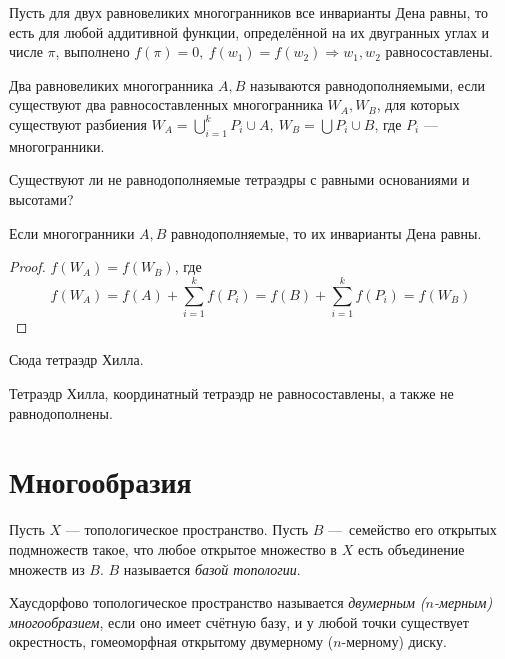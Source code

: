 \begin{theorem}[Сидлер]
    Пусть для двух равновеликих многогранников все инварианты Дена равны, то есть для любой аддитивной функции, определённой на их двугранных углах и числе $\pi$, выполнено $f(\pi) = 0, \ f(w_1) = f(w_2) \Rightarrow w_1, w_2$ равносоставлены.
\end{theorem}

\begin{definition}
    Два равновеликих многогранника $A, B$ называются равнодополняемыми, если существуют два равносоставленных многогранника $W_A, W_B$, для которых существуют разбиения $W_A = \bigcup_{i = 1}^k P_i \cup A, \ W_B = \bigcup P_i \cup B$, где $P_i$ — многогранники.
\end{definition}

\begin{theorem}
    Существуют ли не равнодополняемые тетраэдры с равными основаниями и высотами?
\end{theorem}

\begin{statement}
    Если многогранники $A,B$ равнодополняемые, то их инварианты Дена равны.
\end{statement}
\begin{proof}
    $f(W_A) = f(W_B)$, где $$f(W_A) = f(A) + \sum_{i = 1}^{k} f(P_i) = f(B) + \sum_{i = 1}^{k} f(P_i) = f(W_B)$$
\end{proof}

Сюда тетраэдр Хилла.

\begin{statement}
    Тетраэдр Хилла, координатный тетраэдр не равносоставлены, а также не равнодополнены.
\end{statement}

\newpage
\section{Многообразия}

\begin{definition}
    Пусть $X$ — топологическое пространство. Пусть $B$ — семейство его открытых подмножеств такое, что любое открытое множество в $X$ есть объединение множеств из $B$. $B$ называется \textit{базой топологии}.
\end{definition}

\begin{definition}
    Хаусдорфово топологическое пространство называется \textit{двумерным ($n$-мерным) многообразием}, если оно имеет счётную базу, и у любой точки существует окрестность, гомеоморфная открытому двумерному ($n$-мерному) диску.
\end{definition}

